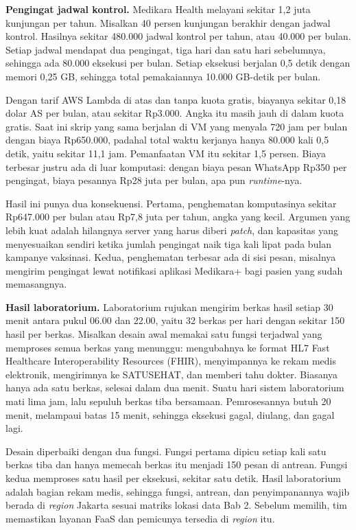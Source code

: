\begin{kasus}[title={Kasus Medikara Health: Pengingat Kontrol dan Hasil Laboratorium}]
  \textbf{Pengingat jadwal kontrol.} Medikara Health melayani sekitar 1,2 juta kunjungan per
  tahun. Misalkan 40 persen kunjungan berakhir dengan jadwal kontrol. Hasilnya sekitar 480.000
  jadwal kontrol per tahun, atau 40.000 per bulan. Setiap jadwal mendapat dua pengingat, tiga hari
  dan satu hari sebelumnya, sehingga ada 80.000 eksekusi per bulan. Setiap eksekusi berjalan 0,5
  detik dengan memori 0,25 GB, sehingga total pemakaiannya 10.000 GB-detik per bulan.

  Dengan tarif AWS Lambda di atas dan tanpa kuota gratis, biayanya sekitar 0,18 dolar AS per
  bulan, atau sekitar Rp3.000. Angka itu masih jauh di dalam kuota gratis. Saat ini skrip yang
  sama berjalan di VM yang menyala 720 jam per bulan dengan biaya Rp650.000, padahal total waktu
  kerjanya hanya 80.000 kali 0,5 detik, yaitu sekitar 11,1 jam. Pemanfaatan VM itu sekitar 1,5
  persen. Biaya terbesar justru ada di luar komputasi: dengan biaya pesan WhatsApp Rp350 per
  pengingat, biaya pesannya Rp28 juta per bulan, apa pun \textit{runtime}-nya.

  Hasil ini punya dua konsekuensi. Pertama, penghematan komputasinya sekitar Rp647.000 per bulan
  atau Rp7,8 juta per tahun, angka yang kecil. Argumen yang lebih kuat adalah hilangnya server yang
  harus diberi \textit{patch}, dan kapasitas yang menyesuaikan sendiri ketika jumlah pengingat
  naik tiga kali lipat pada bulan kampanye vaksinasi. Kedua, penghematan terbesar ada di sisi
  pesan, misalnya mengirim pengingat lewat notifikasi aplikasi Medikara+ bagi pasien yang sudah
  memasangnya.

  \textbf{Hasil laboratorium.} Laboratorium rujukan mengirim berkas hasil setiap 30 menit antara
  pukul 06.00 dan 22.00, yaitu 32 berkas per hari dengan sekitar 150 hasil per berkas. Misalkan
  desain awal memakai satu fungsi terjadwal yang memproses semua berkas yang menunggu: mengubahnya
  ke format HL7 Fast Healthcare Interoperability Resources (FHIR), menyimpannya ke rekam medis
  elektronik, mengirimnya ke SATUSEHAT, dan memberi tahu dokter. Biasanya hanya ada satu berkas,
  selesai dalam dua menit. Suatu hari sistem laboratorium mati lima jam, lalu sepuluh berkas tiba
  bersamaan. Pemrosesannya butuh 20 menit, melampaui batas 15 menit, sehingga eksekusi gagal,
  diulang, dan gagal lagi.

  Desain diperbaiki dengan dua fungsi. Fungsi pertama dipicu setiap kali satu berkas tiba dan
  hanya memecah berkas itu menjadi 150 pesan di antrean. Fungsi kedua memproses satu hasil per
  eksekusi, sekitar satu detik. Hasil laboratorium adalah bagian rekam medis, sehingga fungsi,
  antrean, dan penyimpanannya wajib berada di \textit{region} Jakarta sesuai matriks lokasi data
  Bab 2. Sebelum memilih, tim memastikan layanan FaaS dan pemicunya tersedia di \textit{region}
  itu.
\end{kasus}

